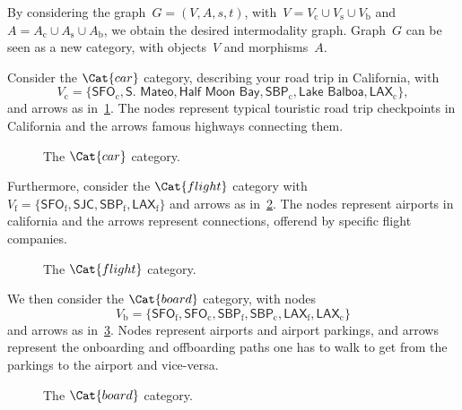 By considering the graph~$G=(V,A,s,t)$, with~$V=V_\mathrm{c}\cup V_\mathrm{s}\cup V_\mathrm{b}$ and~$A=A_\mathrm{c}\cup A_\mathrm{s}\cup A_\mathrm{b}$, we obtain the desired intermodality graph. Graph~$G$ can be seen as a new category, with objects~$V$ and morphisms~$A$.
\begin{example}
Consider the $\Cat{car}$ category, describing your road trip in California, with
\begin{equation*}
    V_\mathrm{c}=\{\textsf{SFO}_\mathrm{c},\textsf{S. Mateo},\textsf{Half Moon Bay},\textsf{SBP}_\mathrm{c},\textsf{Lake Balboa},\textsf{LAX}_\mathrm{c}\},
\end{equation*}
and arrows as in~\cref{fig:carcat}. The nodes represent typical touristic road trip checkpoints in California and the arrows famous highways connecting them.

\begin{figure}[h!]
\begin{center}
\end{center}
\caption{The $\Cat{car}$ category. \label{fig:carcat}}
\end{figure}

Furthermore, consider the $\Cat{flight}$ category with $V_\mathrm{f}=\{\textsf{SFO}_\mathrm{f}, \textsf{SJC}, \textsf{SBP}_\mathrm{f}, \textsf{LAX}_\mathrm{f}\}$ and arrows as in~\cref{fig:flight}. The nodes represent airports in california and the arrows represent connections, offerend by specific flight companies.

\begin{figure}[h!]
\begin{center}
\end{center}
\caption{The $\Cat{flight}$ category. \label{fig:flight}}
\end{figure}

We then consider the $\Cat{board}$ category, with nodes
\begin{equation*}
    V_\mathrm{b}=\{\textsf{SFO}_\mathrm{f},\textsf{SFO}_\mathrm{c},\textsf{SBP}_\mathrm{f},\textsf{SBP}_\mathrm{c},\textsf{LAX}_\mathrm{f},\textsf{LAX}_\mathrm{c}\}
\end{equation*}
and arrows as in~\cref{fig:boarding}. Nodes represent airports and airport parkings, and arrows represent the onboarding and offboarding paths one has to walk to get from the parkings to the airport and vice-versa.

\begin{figure}[h!]
\begin{center}
\end{center}
\caption{The $\Cat{board}$ category. \label{fig:boarding}}
\end{figure}


\end{example}
